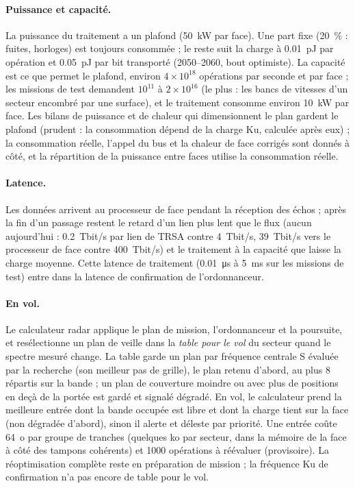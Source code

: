 \documentclass[11pt,a4paper]{article}
\begin{document}
\paragraph{Puissance et capacité.} La puissance du traitement a un plafond (\SI{50}{kW} par face). Une part fixe
(\SI{20}{\percent} : fuites, horloges) est toujours consommée ; le reste suit la charge à \SI{0.01}{pJ} par opération et
\SI{0.05}{pJ} par bit transporté (2050--2060, bout optimiste). La capacité est ce que permet le plafond, environ
$4\times10^{18}$ opérations par seconde et par face ; les missions de test demandent $10^{11}$ à $2\times10^{16}$ (le
plus : les bancs de vitesses d'un secteur encombré par une surface), et le traitement consomme environ \SI{10}{kW} par
face. Les bilans de puissance et de chaleur qui dimensionnent le plan gardent le plafond (prudent : la consommation
dépend de la charge Ku, calculée après eux) ; la consommation réelle, l'appel du bus et la chaleur de face corrigés sont
donnés à côté, et la répartition de la puissance entre faces utilise la consommation réelle.

\paragraph{Latence.} Les données arrivent au processeur de face pendant la réception des échos ; après la fin d'un
passage restent le retard d'un lien plus lent que le flux (aucun aujourd'hui : \SI{0.2}{Tbit/s} par lien de TRSA contre
\SI{4}{Tbit/s}, \SI{39}{Tbit/s} vers le processeur de face contre \SI{400}{Tbit/s}) et le traitement à la capacité que
laisse la charge moyenne. Cette latence de traitement (\SI{0.01}{\micro s} à \SI{5}{ms} sur les missions de test) entre
dans la latence de confirmation de l'ordonnanceur.

\paragraph{En vol.} Le calculateur radar applique le plan de mission, l'ordonnanceur et la poursuite, et resélectionne
un plan de veille dans la \emph{table pour le vol} du secteur quand le spectre mesuré change. La table garde un plan
par fréquence centrale S évaluée par la recherche (son meilleur pas de grille), le plan retenu d'abord, au plus 8
répartis sur la bande ; un plan de couverture moindre ou avec plus de positions en deçà de la portée est gardé et
signalé dégradé. En vol, le calculateur prend la meilleure entrée dont la bande occupée est libre et dont la charge
tient sur la face (non dégradée d'abord), sinon il alerte et déleste par priorité. Une entrée coûte \SI{64}{o} par
groupe de tranches (quelques ko par secteur, dans la mémoire de la face à côté des tampons cohérents) et \num{1000}
opérations à réévaluer (provisoire). La réoptimisation complète reste en préparation de mission ; la fréquence Ku de
confirmation n'a pas encore de table pour le vol.
\end{document}
